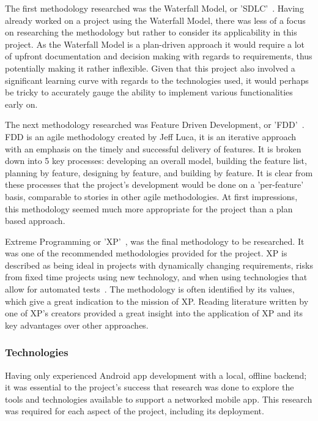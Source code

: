 The first methodology researched was the Waterfall Model, or 'SDLC'~\cite{sdlc_ref}. Having already worked on a project using the Waterfall Model, there was less of a focus on researching the methodology but rather to consider its applicability in this project. As the Waterfall Model is a plan-driven approach it would require a lot of upfront documentation and decision making with regards to requirements, thus potentially making it rather inflexible. Given that this project also involved a significant learning curve with regards to the technologies used, it would perhaps be tricky to accurately gauge the ability to implement various functionalities early on.

The next methodology researched was Feature Driven Development, or 'FDD'~\cite{fdd_practical_guide_ref}. FDD is an agile methodology created by Jeff Luca, it is an iterative approach with an emphasis on the timely and successful delivery of features. It is broken down into 5 key processes: developing an overall model, building the feature list, planning by feature, designing by feature, and building by feature. It is clear from these processes that the project's development would be done on a 'per-feature' basis, comparable to stories in other agile methodologies. At first impressions, this methodology seemed much more appropriate for the project than a plan based approach.

Extreme Programming or 'XP'~\cite{xp_explained_ref, xp_agilealliance_ref}, was the final methodology to be researched. It was one of the recommended methodologies provided for the project. XP is described as being ideal in projects with dynamically changing requirements, risks from fixed time projects using new technology, and when using technologies that allow for automated tests~\cite{xp_agilealliance_ref}. The methodology is often identified by its values, which give a great indication to the mission of XP. Reading literature written by one of XP's creators provided a great insight into the application of XP and its key advantages over other approaches.

\subsubsection{Technologies}
Having only experienced Android app development with a local, offline backend; it was essential to the project's success that research was done to explore the tools and technologies available to support a networked mobile app. This research was required for each aspect of the project, including its deployment.


